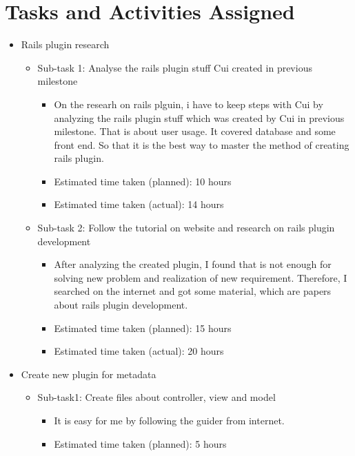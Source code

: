 \documentclass{article}
\begin{document}
\section*{Tasks and Activities Assigned}
\begin{itemize}
    \item Rails plugin research
        \begin{itemize}
            \item Sub-task 1: Analyse the rails plugin stuff Cui created in previous milestone
                \begin{itemize}
                    \item On the researh on rails plguin, i have to keep steps with Cui by analyzing the rails plugin stuff which was created by Cui in previous milestone. That is about user usage. It covered database and some front end. So that it is the best way to master the method of creating rails plugin.
                    \item Estimated time taken (planned): 10 hours
                    \item Estimated time taken (actual): 14 hours
                \end{itemize}
            \item Sub-task 2: Follow the tutorial on website and research on rails plugin development
                \begin{itemize}
                    \item After analyzing the created plugin, I found that is not enough for solving new problem and realization of new requirement. Therefore, I searched on the internet and got some material, which are papers about rails plugin development.
                    \item Estimated time taken (planned): 15 hours
                    \item Estimated time taken (actual): 20 hours
                \end{itemize}
        \end{itemize}
    \item Create new plugin for metadata
        \begin{itemize}
            \item Sub-task1: Create files about controller, view and model
                \begin{itemize}
                    \item It is easy for me by following the guider from internet. 
                    \item Estimated time taken (planned): 5 hours

\end{itemize}
\end{itemize}
\end{itemize}
\end{document}
